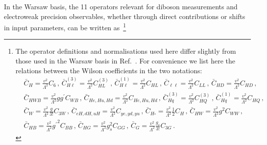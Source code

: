 \documentclass[../report.tex]{subfiles}
\begin{document}
In the Warsaw basis, the 11 operators relevant for diboson measurements and electroweak precision observables, 
whether through direct contributions or shifts in input parameters, can be written as~\footnote{The operator definitions and normalisations used here differ slightly from those used in the Warsaw basis in Ref.~\cite{Ellis:2018gqa}. For convenience we list here the relations between the Wilson coefficients in the two notations:
%
\begin{align*}
&\bar{C}_H = \frac{v^2}{\Lambda^2}C_6  \, , \,  \bar{C}_{H\ell}^{(3)} = \frac{v^2}{\Lambda^2} C_{HL}^{(3)}  \, , \, \bar{C}_{H\ell}^{(1)} = \frac{v^2}{\Lambda^2} C_{HL}  \, , \,  \bar{C}_{\ell\ell} = \frac{v^2}{\Lambda^2} C_{LL}  \, , \,  \bar{C}_{HD} = \frac{v^2}{\Lambda^2} C_{HD}  \, , \, \\ 
& \bar{C}_{HWB} = \frac{v^2}{\Lambda^2} g g^\prime C_{WB}  \, , \,  \bar{C}_{He,Hu,Hd} = \frac{v^2}{\Lambda^2} C_{He,Hu,Hd}  \, , \,  \bar{C}_{Hq}^{(3)} = \frac{v^2}{\Lambda^2} C_{HQ}^{(3)} \, , \, \bar{C}_{Hq}^{(1)} = \frac{v^2}{\Lambda^2} C_{HQ}  \, , \,  \\
& \bar{C}_W = \frac{v^2}{\Lambda^2} \frac{g}{3!} C_{3W} \, , \,  \bar{C}_{eH, dH, uH} = \frac{v^2}{\Lambda^2} C_{ye, yd, yu}  \, , \, \bar{C}_{H\square} = \frac{v^2}{\Lambda^2}  \frac{1}{2} C_H \, , \,  \bar{C}_{HW} = \frac{v^2}{\Lambda^2} g^2 C_{WW}  \, , \, \\
& \bar{C}_{HB} = \frac{v^2}{\Lambda^2} {g^\prime}^2 C_{BB}  \, , \, \bar{C}_{HG} = \frac{v^2}{\Lambda^2} g_s^2 C_{GG}  \, , \,  \bar{C}_G = \frac{v^2}{\Lambda^2} \frac{g_s}{3!} C_{3G}  \, .
\end{align*}
}  
%
\end{document}
